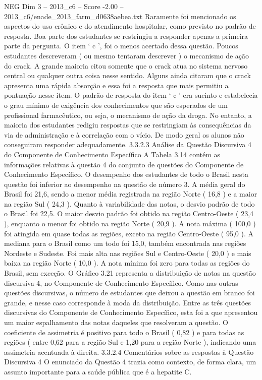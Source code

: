 \begin{textsample}{NEG Dim 3 – 2013\_c6 – Score -2.00 – 2013\_c6/enade\_2013\_farm\_d0638aebea.txt}
Raramente foi mencionado os aspectos do uso crônico e do atendimento hospitalar, como previsto no padrão de resposta.
Boa parte dos estudantes se restringiu a responder apenas a primeira parte da pergunta.
O item ‘ c ’, foi o menos acertado dessa questão.
Poucos estudantes descreveram ( ou mesmo tentaram descrever ) o mecanismo de ação do crack.
A grande maioria citou somente que o crack atua no sistema nervoso central ou qualquer outra coisa nesse sentido.
Alguns ainda citaram que o crack apresenta uma rápida absorção e essa foi a resposta que mais permitiu a pontuação nesse item.
O padrão de resposta do item ‘ c ’ era sucinto e estabelecia o grau mínimo de exigência dos conhecimentos que são esperados de um profissional farmacêutico, ou seja, o mecanismo de ação da droga.
No entanto, a maioria dos estudantes redigiu respostas que se restringiam às consequências da via de administração e à correlação com o vício.
De modo geral os alunos não conseguiram responder adequadamente. 3.3.2.3 Análise da Questão Discursiva 4 do Componente de Conhecimento Específico A Tabela 3.14 contém as informações relativas à questão 4 do conjunto de questões do Componente de Conhecimento Específico.
O desempenho dos estudantes de todo o Brasil nesta questão foi inferior ao desempenho na questão de número 3.
A média geral do Brasil foi 21,6, sendo a menor média registrada na região Norte ( 16,8 ) e a maior na região Sul ( 24,3 ).
Quanto à variabilidade das notas, o desvio padrão de todo o Brasil foi 22,5.
O maior desvio padrão foi obtido na região Centro-Oeste ( 23,4 ), enquanto o menor foi obtido na região Norte ( 20,9 ).
A nota máxima ( 100,0 ) foi atingida em quase todas as regiões, exceto na região Centro-Oeste ( 95,0 ).
A mediana para o Brasil como um todo foi 15,0, também encontrada nas regiões Nordeste e Sudeste.
Foi mais alta nas regiões Sul e Centro-Oeste ( 20,0 ) e mais baixa na região Norte ( 10,0 ).
A nota mínima foi zero para todas as regiões do Brasil, sem exceção.
O Gráfico 3.21 representa a distribuição de notas na questão discursiva 4, no Componente de Conhecimento Específico.
Como nas outras questões discursivas, o número de estudantes que deixou a questão em branco foi grande, e nesse caso corresponde à moda da distribuição.
Entre as três questões discursivas do Componente de Conhecimento Específico, esta foi a que apresentou um maior espalhamento das notas daqueles que resolveram a questão.
O coeficiente de assimetria é positivo para todo o Brasil ( 0,82 ) e para todas as regiões ( entre 0,62 para a região Sul e 1,20 para a região Norte ), indicando uma assimetria acentuada à direita. 3.3.2.4 Comentários sobre as respostas à Questão Discursiva 4 O enunciado da Questão 4 trazia como contexto, de forma clara, um assunto importante para a saúde pública que é a hepatite C.

\end{textsample}
